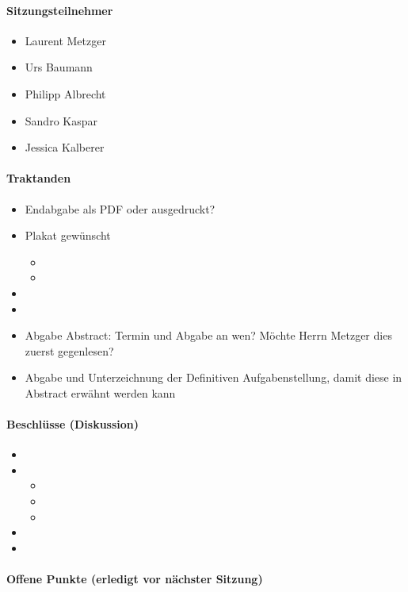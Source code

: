 \paragraph{Sitzungsteilnehmer}
\begin{itemize}	
	\item Laurent Metzger 
	\item Urs Baumann
	\item Philipp Albrecht
	\item Sandro Kaspar
	\item Jessica Kalberer
\end{itemize}

\paragraph{Traktanden}
\begin{itemize}	
	\item Endabgabe als PDF oder ausgedruckt?
	\item Plakat gewünscht
	\begin{itemize}
		\item 
		\item 
	\end{itemize}
	\item 
	\item 
	\item Abgabe Abstract: Termin und Abgabe an wen? Möchte Herrn Metzger dies zuerst gegenlesen?
	\item Abgabe und Unterzeichnung der Definitiven Aufgabenstellung, damit diese in Abstract erwähnt werden kann
\end{itemize}

\paragraph{Beschlüsse (Diskussion)}
\begin{itemize}	
	\item 
	\item 
	\begin{itemize}
		\item 
		\item 
		\item 
	\end{itemize}
	\item 
	\item 
\end{itemize}

\paragraph{Offene Punkte (erledigt vor nächster Sitzung)} \mbox{}

